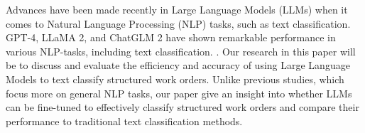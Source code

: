 \documentclass{article}
\begin{document}
Advances have been made recently in Large Language Models (LLMs) when it comes to Natural Language Processing (NLP) tasks,
such as text classification.
GPT-4, LLaMA 2, and ChatGLM 2 have shown remarkable performance in various NLP-tasks, including text classification.
\cite{zhang2024}.
Our research in this paper will be to discuss and evaluate the efficiency and accuracy of using Large Language Models
to text classify structured work orders. Unlike previous studies, which focus more on general NLP tasks,
our paper give an insight into whether LLMs can be fine-tuned to effectively classify structured work orders and compare their
performance to traditional text classification methods.




\end{document}
